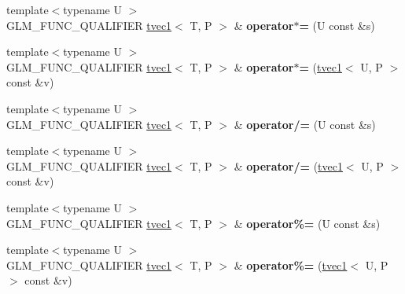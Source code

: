 \begin{DoxyCompactItemize}
\item 
{\footnotesize template$<$typename U $>$ }\\G\+L\+M\+\_\+\+F\+U\+N\+C\+\_\+\+Q\+U\+A\+L\+I\+F\+I\+ER \hyperlink{structglm_1_1detail_1_1tvec1}{tvec1}$<$ T, P $>$ \& {\bfseries operator$\ast$=} (U const \&s)\hypertarget{structglm_1_1detail_1_1tvec1_a38c64ab613b91222e34ffd8f8a97af7a}{}\label{structglm_1_1detail_1_1tvec1_a38c64ab613b91222e34ffd8f8a97af7a}

\item 
{\footnotesize template$<$typename U $>$ }\\G\+L\+M\+\_\+\+F\+U\+N\+C\+\_\+\+Q\+U\+A\+L\+I\+F\+I\+ER \hyperlink{structglm_1_1detail_1_1tvec1}{tvec1}$<$ T, P $>$ \& {\bfseries operator$\ast$=} (\hyperlink{structglm_1_1detail_1_1tvec1}{tvec1}$<$ U, P $>$ const \&v)\hypertarget{structglm_1_1detail_1_1tvec1_ab5aa275a687a56ff82469c9c9334f145}{}\label{structglm_1_1detail_1_1tvec1_ab5aa275a687a56ff82469c9c9334f145}

\item 
{\footnotesize template$<$typename U $>$ }\\G\+L\+M\+\_\+\+F\+U\+N\+C\+\_\+\+Q\+U\+A\+L\+I\+F\+I\+ER \hyperlink{structglm_1_1detail_1_1tvec1}{tvec1}$<$ T, P $>$ \& {\bfseries operator/=} (U const \&s)\hypertarget{structglm_1_1detail_1_1tvec1_ab1e87f461bbf279b20fc1e242b6e9f53}{}\label{structglm_1_1detail_1_1tvec1_ab1e87f461bbf279b20fc1e242b6e9f53}

\item 
{\footnotesize template$<$typename U $>$ }\\G\+L\+M\+\_\+\+F\+U\+N\+C\+\_\+\+Q\+U\+A\+L\+I\+F\+I\+ER \hyperlink{structglm_1_1detail_1_1tvec1}{tvec1}$<$ T, P $>$ \& {\bfseries operator/=} (\hyperlink{structglm_1_1detail_1_1tvec1}{tvec1}$<$ U, P $>$ const \&v)\hypertarget{structglm_1_1detail_1_1tvec1_a76603a1972a31cd51a5281e3794ae2e3}{}\label{structglm_1_1detail_1_1tvec1_a76603a1972a31cd51a5281e3794ae2e3}

\item 
{\footnotesize template$<$typename U $>$ }\\G\+L\+M\+\_\+\+F\+U\+N\+C\+\_\+\+Q\+U\+A\+L\+I\+F\+I\+ER \hyperlink{structglm_1_1detail_1_1tvec1}{tvec1}$<$ T, P $>$ \& {\bfseries operator\%=} (U const \&s)\hypertarget{structglm_1_1detail_1_1tvec1_a9a958fd9f0255f2d40924adcb2e9eb0c}{}\label{structglm_1_1detail_1_1tvec1_a9a958fd9f0255f2d40924adcb2e9eb0c}

\item 
{\footnotesize template$<$typename U $>$ }\\G\+L\+M\+\_\+\+F\+U\+N\+C\+\_\+\+Q\+U\+A\+L\+I\+F\+I\+ER \hyperlink{structglm_1_1detail_1_1tvec1}{tvec1}$<$ T, P $>$ \& {\bfseries operator\%=} (\hyperlink{structglm_1_1detail_1_1tvec1}{tvec1}$<$ U, P $>$ const \&v)\hypertarget{structglm_1_1detail_1_1tvec1_a711db33765785eacc65e313535211c76}{}\label{structglm_1_1detail_1_1tvec1_a711db33765785eacc65e313535211c76}


\end{DoxyCompactItemize}
